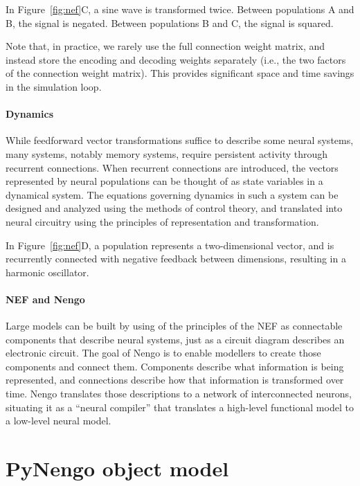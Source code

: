 \documentclass{frontiersSCNS}
\begin{document}
In Figure~\ref{fig:nef}C,
a sine wave is transformed twice.
Between populations A and B,
the signal is negated.
Between populations B and C,
the signal is squared.

Note that, in practice, we rarely use
the full connection weight matrix,
and instead store
the encoding and decoding weights separately
(i.e., the two factors of the connection weight matrix).
This provides significant
space and time savings in the simulation loop.

\paragraph{Dynamics}
While feedforward vector transformations
suffice to describe
some neural systems,
many systems, notably memory systems,
require persistent activity through recurrent connections.
When recurrent connections are introduced,
the vectors represented by neural populations
can be thought of as state variables
in a dynamical system.
The equations governing dynamics
in such a system
can be designed and analyzed
using the methods of control theory,
and translated into neural circuitry
using the principles
of representation and transformation.

In Figure~\ref{fig:nef}D,
a population represents a two-dimensional vector,
and is recurrently connected
with negative feedback between dimensions,
resulting in a harmonic oscillator.

\paragraph{NEF and Nengo}
Large models can be built
by using of the principles of the NEF
as connectable components
that describe neural systems,
just as a circuit diagram
describes an electronic circuit.
The goal of Nengo is to enable
modellers to create those components
and connect them.
Components describe
what information is being represented,
and connections describe
how that information is transformed
over time.
Nengo translates those descriptions
to a network of interconnected neurons,
situating it as a ``neural compiler''
that translates
a high-level functional model
to a low-level neural model.

\section{PyNengo object model}
\end{document}
